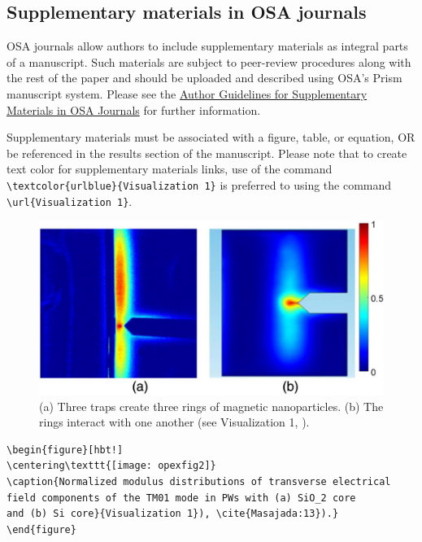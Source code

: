 \documentclass{osa-article}
\begin{document}
\subsection{Supplementary materials in OSA journals}

OSA journals allow authors to include supplementary materials as integral parts of a manuscript. Such materials are subject to peer-review procedures along with the rest of the paper and should be uploaded and described using OSA's Prism manuscript system. Please see the \href{http://www.osapublishing.org/submit/style/multimedia.cfm}{Author Guidelines for Supplementary Materials in OSA Journals} for further information.

Supplementary materials must be associated with a figure, table, or equation, OR be referenced in the results section of the manuscript. Please note that to create text color for supplementary materials links, use of the command \\
\verb|\textcolor{urlblue}{Visualization 1}| is preferred to using the command\\
\verb|\url{Visualization 1}|.

\begin{figure}[ht!]
\centering\includegraphics{osafig2}
\caption{(a) Three traps create three rings of magnetic nanoparticles. (b) The rings interact with one another (see \textcolor{urlblue}{Visualization 1}, \cite{Masajada:13}).}
\end{figure}


\begin{verbatim}
\begin{figure}[hbt!]
\centering\texttt{[image: opexfig2]}
\caption{Normalized modulus distributions of transverse electrical
field components of the TM01 mode in PWs with (a) SiO_2 core
and (b) Si core}{Visualization 1}), \cite{Masajada:13}).}
\end{figure}
\end{verbatim}
\end{document}
